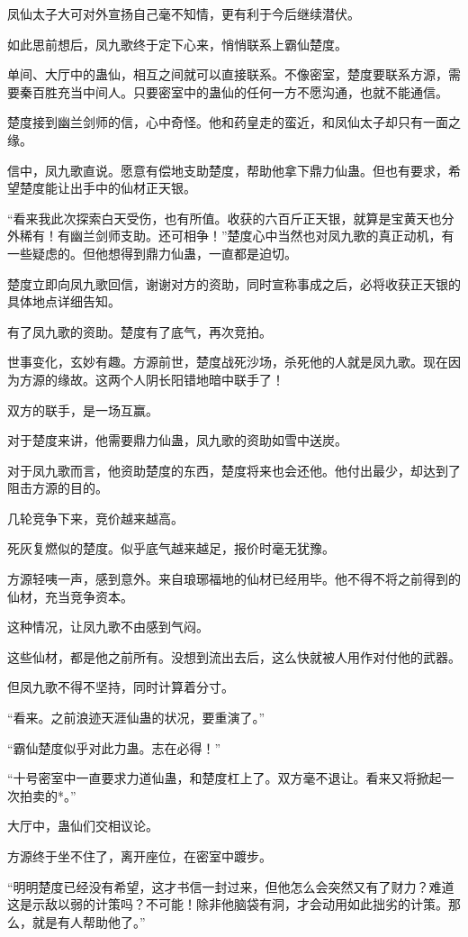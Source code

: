 \begin{this_body}
凤仙太子大可对外宣扬自己毫不知情，更有利于今后继续潜伏。

如此思前想后，凤九歌终于定下心来，悄悄联系上霸仙楚度。

单间、大厅中的蛊仙，相互之间就可以直接联系。不像密室，楚度要联系方源，需要秦百胜充当中间人。只要密室中的蛊仙的任何一方不愿沟通，也就不能通信。

楚度接到幽兰剑师的信，心中奇怪。他和药皇走的蛮近，和凤仙太子却只有一面之缘。

信中，凤九歌直说。愿意有偿地支助楚度，帮助他拿下鼎力仙蛊。但也有要求，希望楚度能让出手中的仙材正天银。

“看来我此次探索白天受伤，也有所值。收获的六百斤正天银，就算是宝黄天也分外稀有！有幽兰剑师支助。还可相争！”楚度心中当然也对凤九歌的真正动机，有一些疑虑的。但他想得到鼎力仙蛊，一直都是迫切。

楚度立即向凤九歌回信，谢谢对方的资助，同时宣称事成之后，必将收获正天银的具体地点详细告知。

有了凤九歌的资助。楚度有了底气，再次竞拍。

世事变化，玄妙有趣。方源前世，楚度战死沙场，杀死他的人就是凤九歌。现在因为方源的缘故。这两个人阴长阳错地暗中联手了！

双方的联手，是一场互赢。

对于楚度来讲，他需要鼎力仙蛊，凤九歌的资助如雪中送炭。

对于凤九歌而言，他资助楚度的东西，楚度将来也会还他。他付出最少，却达到了阻击方源的目的。

几轮竞争下来，竞价越来越高。

死灰复燃似的楚度。似乎底气越来越足，报价时毫无犹豫。

方源轻咦一声，感到意外。来自琅琊福地的仙材已经用毕。他不得不将之前得到的仙材，充当竞争资本。

这种情况，让凤九歌不由感到气闷。

这些仙材，都是他之前所有。没想到流出去后，这么快就被人用作对付他的武器。

但凤九歌不得不坚持，同时计算着分寸。

“看来。之前浪迹天涯仙蛊的状况，要重演了。”

“霸仙楚度似乎对此力蛊。志在必得！”

“十号密室中一直要求力道仙蛊，和楚度杠上了。双方毫不退让。看来又将掀起一次拍卖的*。”

大厅中，蛊仙们交相议论。

方源终于坐不住了，离开座位，在密室中踱步。

“明明楚度已经没有希望，这才书信一封过来，但他怎么会突然又有了财力？难道这是示敌以弱的计策吗？不可能！除非他脑袋有洞，才会动用如此拙劣的计策。那么，就是有人帮助他了。”


\end{this_body}
